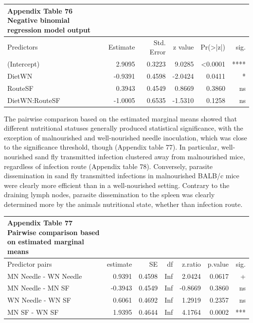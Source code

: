 \documentclass[
  12pt,
  letterpaper,
]{article}
\begin{document}
\begingroup
\fontsize{12.0pt}{14.4pt}\selectfont
\begin{longtable}{l|rrrrr}
\caption*{
{\large \textbf{Appendix Table 76}} \\ 
{\small \textbf{Negative binomial regression model output}}
} \\ 
\toprule
Predictors & {Estimate} & {Std. Error} & {z value} & {Pr(>|z|)} & {sig.} \\ 
\midrule\addlinespace[2.5pt]
(Intercept) & 2.9095 & 0.3223 & 9.0285 & <0.0001 & **** \\ 
DietWN & -0.9391 & 0.4598 & -2.0424 & 0.0411 & * \\ 
RouteSF & 0.3943 & 0.4549 & 0.8669 & 0.3860 & ns \\ 
DietWN:RouteSF & -1.0005 & 0.6535 & -1.5310 & 0.1258 & ns \\ 
\bottomrule
\end{longtable}
\endgroup

The pairwise comparison based on the estimated marginal means showed that different nutritional statuses generally produced statistical significance, with the exception of malnourished and well-nourished needle inoculation, which was close to the significance threshold, though (Appendix table 77). In particular, well-nourished sand fly transmitted infection clustered away from malnourished mice, regardless of infection route (Appendix table 78). Conversely, parasite dissemination in sand fly transmitted infections in malnourished BALB/c mice were clearly more efficient than in a well-nourished setting. Contrary to the draining lymph nodes, parasite dissemination to the spleen was clearly determined more by the animals nutritional state, whether than infection route.

\begingroup
\fontsize{12.0pt}{14.4pt}\selectfont
\begin{longtable}{l|rrrrrr}
\caption*{
{\large \textbf{Appendix Table 77}} \\ 
{\small \textbf{Pairwise comparison based on estimated marginal means}}
} \\ 
\toprule
Predictor pairs & {estimate} & {SE} & {df} & {z.ratio} & {p.value} & {sig.} \\ 
\midrule\addlinespace[2.5pt]
MN Needle - WN Needle & 0.9391 & 0.4598 & Inf & 2.0424 & 0.0617 & + \\ 
MN Needle - MN SF & -0.3943 & 0.4549 & Inf & -0.8669 & 0.3860 & ns \\ 
WN Needle - WN SF & 0.6061 & 0.4692 & Inf & 1.2919 & 0.2357 & ns \\ 
MN SF - WN SF & 1.9395 & 0.4644 & Inf & 4.1764 & 0.0002 & *** \\ 
\bottomrule
\end{longtable}
\endgroup
\end{document}
